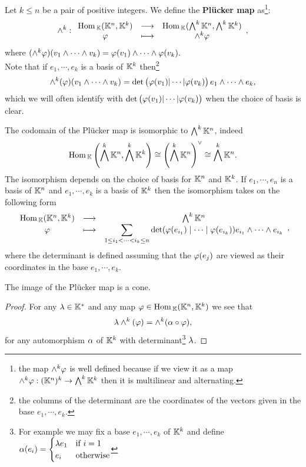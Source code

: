 \begin{definition}
Let $k\leq n$ be a pair of positive integers. We define the \textbf{Pl\"ucker map} as\footnote{the map $\wedge^k\varphi$ is well defined because if we view it as a map $\wedge^k\varphi:(\mathbb{K}^n)^k\to \bigwedge^k\mathbb{K}^k$ then it is multilinear and alternating.}:
\[\wedge^k:\begin{array}{ccc} {\mathrm{Hom}\,_{\mathbb{K}}(\mathbb{K}^n,\mathbb{K}^k)} & \longrightarrow & {\mathrm{Hom}\,_{\mathbb{K}}(\bigwedge^k\mathbb{K}^n,\bigwedge^k\mathbb{K}^k)}\\ {\varphi} & \longmapsto & {\wedge^k\varphi} \end{array},\]
where $(\wedge^k\varphi)(v_1\wedge\cdots\wedge v_k)=\varphi(v_1)\wedge\cdots\wedge\varphi(v_k).$\\
Note that if $e_1,\cdots, e_k$ is a basis of $\mathbb{K}^k$ then\footnote{the columns of the determinant are the coordinates of the vectors given in the base $e_1,\cdots, e_k$.}
\[\wedge^k(\varphi)(v_1\wedge\cdots\wedge v_k)=\det\begin{pmatrix}\varphi(v_1)|\cdots|\varphi(v_k)\end{pmatrix} e_1\wedge\cdots\wedge e_k,\]
which we will often identify with $\det\begin{pmatrix}\varphi(v_1)|\cdots|\varphi(v_k)\end{pmatrix}$ when the choice of basis is clear.
\end{definition}

\begin{remark}\label{CodomainOfPluckerMap}
The codomain of the Pl\"ucker map is isomorphic to $\bigwedge^k\mathbb{K}^n$, indeed
\[\mathrm{Hom}\,_{\mathbb{K}}\left({\bigwedge^k\mathbb{K}^n,\bigwedge^k\mathbb{K}^k}\right)\cong \left({\bigwedge^k\mathbb{K}^n}\right)^{\vee}\cong \bigwedge^k\mathbb{K}^n.\]
The isomorphism depends on the choice of basis for $\mathbb{K}^n$ and $\mathbb{K}^k$. If $e_1,\cdots, e_n$ is a basis of $\mathbb{K}^n$ and $e_1,\cdots, e_k$ is a basis of $\mathbb{K}^k$ then the isomorphism takes on the following form
\[\begin{array}{ccc} {\mathrm{Hom}\,_{\mathbb{K}}(\mathbb{K}^n,\mathbb{K}^k)} & \longrightarrow & {\bigwedge^k\mathbb{K}^n}\\ {\varphi} & \longmapsto & {\displaystyle\sum_{1\leq i_1<\cdots< i_k\leq n} \det(\varphi(e_{i_1})\mid \cdots\mid \varphi(e_{i_k}))e_{i_1}\wedge\cdots\wedge e_{i_k}} \end{array},\]
where the determinant is defined assuming that the $\varphi(e_j)$ are viewed as their coordinates in the base $e_1,\cdots, e_k$.
\end{remark}


\begin{remark}
The image of the Pl\"ucker map is a cone.
\end{remark}
\begin{proof}
For any $\lambda\in \mathbb{K}^\ast$ and any map $\varphi\in \mathrm{Hom}\,_{\mathbb{K}}(\mathbb{K}^n,\mathbb{K}^k)$ we see that
\[\lambda\wedge^k(\varphi)=\wedge^k(\alpha\circ \varphi),\]
for any automorphism $\alpha$ of $\mathbb{K}^k$ with determinant\footnote{For example we may fix a base $e_1,\cdots, e_k$ of $\mathbb{K}^k$ and define $\alpha(e_i)=\begin{cases}
\lambda e_1 &\text{if }i=1\\
e_i &\text{otherwise}
\end{cases}$} $\lambda$.
\end{proof}



